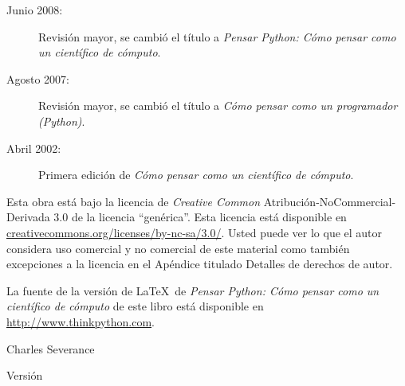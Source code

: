 \begin{latexonly}
{\begin{description}
\item[Junio 2008:] Revisi\'on mayor, se cambi\'o el t\'itulo a
\emph{Pensar Python: C\'omo pensar como un cient\'ifico de c\'omputo}.

\item[Agosto 2007:] Revisi\'on mayor, se cambi\'o el t\'itulo a
\emph{C\'omo pensar como un programador (Python)}.

\item[Abril 2002:] Primera edici\'on de \emph{C\'omo pensar como un cient\'ifico de c\'omputo}.

\end{description}

\vspace{0.2in}

Esta obra est\'a bajo la licencia de \textit{Creative Common}
Atribuci\'on-NoCommercial-Derivada 3.0 de la licencia ``gen\'erica''.
Esta licencia est\'a disponible en
\url{creativecommons.org/licenses/by-nc-sa/3.0/}.  Usted puede ver lo que el autor considera uso comercial y no comercial de este material como tambi\'en excepciones a la licencia en el Ap\'endice titulado Detalles de derechos de autor.

La fuente de la versi\'on de \LaTeX\ de 
\emph{Pensar Python: C\'omo pensar como un cient\'ifico de c\'omputo} de este libro est\'a disponible en
\url{http://www.thinkpython.com}.

\vspace{0.2in}

} %

\end{latexonly}



\begin{htmlonly}


{\Large \thetitle}

{\large 
Charles Severance}

Versi\'on \theversion

\setcounter{chapter}{-1}

\end{htmlonly}
